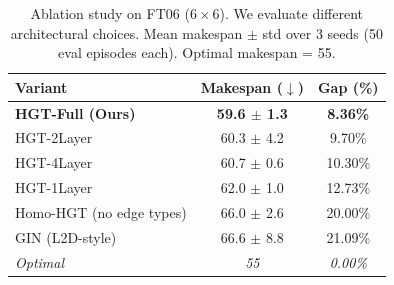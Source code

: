 \begin{table}[t]
  \centering
  \small
  \caption{%
    Ablation study on FT06 ($6\times6$).
    We evaluate different architectural choices.
    Mean makespan $\pm$ std over 3 seeds (50 eval episodes each).
    Optimal makespan = 55.
  }
  \label{tab:ablation}
  \begin{tabular}{lcc}
    \toprule
    \textbf{Variant} & \textbf{Makespan} ($\downarrow$) & \textbf{Gap (\%)} \\
    \midrule
    \textbf{HGT-Full (Ours)} & \textbf{59.6 $\pm$ 1.3} & \textbf{8.36\%} \\
    HGT-2Layer & 60.3 $\pm$ 4.2 & 9.70\% \\
    HGT-4Layer & 60.7 $\pm$ 0.6 & 10.30\% \\
    HGT-1Layer & 62.0 $\pm$ 1.0 & 12.73\% \\
    Homo-HGT (no edge types) & 66.0 $\pm$ 2.6 & 20.00\% \\
    GIN (L2D-style) & 66.6 $\pm$ 8.8 & 21.09\% \\
    \midrule
    \textit{Optimal} & \textit{55} & \textit{0.00\%} \\
    \bottomrule
  \end{tabular}
\end{table}